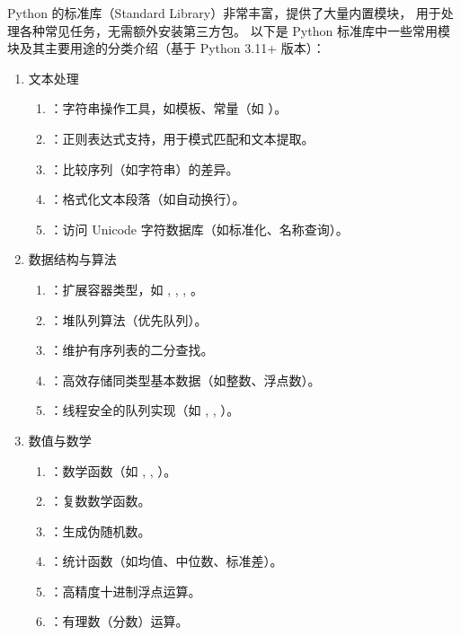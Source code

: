 Python 的标准库（Standard Library）非常丰富，提供了大量内置模块，
用于处理各种常见任务，无需额外安装第三方包。
以下是 Python 标准库中一些常用模块及其主要用途的分类介绍（基于 Python 3.11+ 版本）：

\begin{enumerate}[label=\arabic*)]
    \item 文本处理
    \begin{enumerate}[itemindent=1em,label=(\arabic*)]
        \item {}：字符串操作工具，如模板、常量（如 ）。
        \item {}：正则表达式支持，用于模式匹配和文本提取。
        \item {}：比较序列（如字符串）的差异。
        \item {}：格式化文本段落（如自动换行）。
        \item {}：访问 Unicode 字符数据库（如标准化、名称查询）。
    \end{enumerate}

    \item 数据结构与算法
    \begin{enumerate}[itemindent=1em,label=(\arabic*)]
        \item {}：扩展容器类型，如 , , , 。
        \item {}：堆队列算法（优先队列）。
        \item {}：维护有序列表的二分查找。
        \item {}：高效存储同类型基本数据（如整数、浮点数）。
        \item {}：线程安全的队列实现（如 , , ）。
    \end{enumerate}

    \item 数值与数学
    \begin{enumerate}[itemindent=1em,label=(\arabic*)]
        \item {}：数学函数（如 , , ）。
        \item {}：复数数学函数。
        \item {}：生成伪随机数。
        \item {}：统计函数（如均值、中位数、标准差）。
        \item {}：高精度十进制浮点运算。
        \item {}：有理数（分数）运算。
    \end{enumerate}


\end{enumerate}
